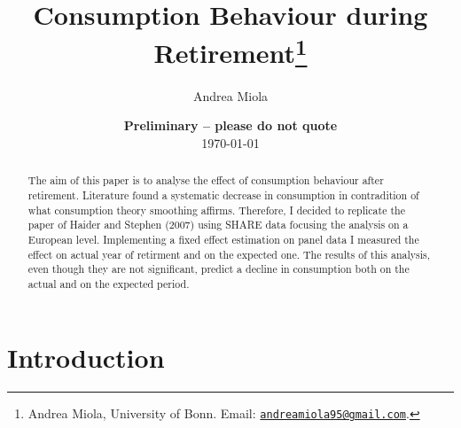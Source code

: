 \documentclass[11pt, a4paper, leqno]{article}
\begin{document}
\title{Consumption Behaviour during Retirement\thanks{Andrea Miola, University of Bonn. Email: \href{mailto:andreamiola95@gmail.com}{\nolinkurl{andreamiola95@gmail.com}}.}}

\author{Andrea Miola}

\date{
{\bf Preliminary -- please do not quote}
\\[1ex]
\today
}

\maketitle


\begin{abstract}
	The aim of this paper is to analyse the effect of consumption behaviour after retirement. Literature found a systematic decrease in consumption in contradition of what consumption theory smoothing affirms. Therefore, I decided to replicate the paper of Haider and Stephen (2007) using SHARE data focusing the analysis on a European level. Implementing a fixed effect estimation on panel data I measured the effect on actual year of retirment and on the expected one. The results of this analysis, even though they are not significant, predict a decline in consumption both on the actual and on the expected period.
\end{abstract}
\clearpage

\section{Introduction} %
\label{sec:introduction}
\end{document}
